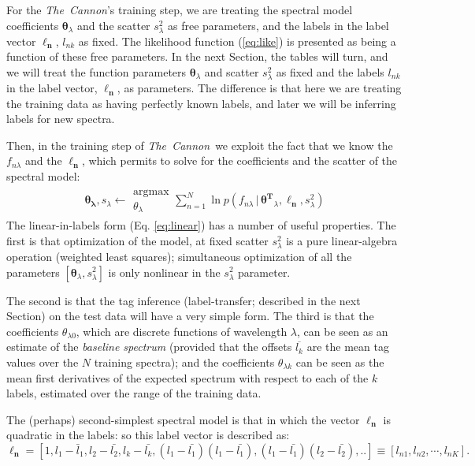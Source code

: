 \documentclass[12pt, preprint]{aastex}
\newcommand{\sectionname}{Section}
\newcommand{\set}[1]{\bm{#1}}
\newcommand{\mean}[1]{\overline{#1}}
\newcommand{\given}{\,|\,}
\newcommand{\tc}{\textsl{The~Cannon}}
\begin{document}
For the \tc 's training step, we are treating the spectral model coefficients
$\set{\theta}_\lambda$ and the scatter $s_\lambda^2$ as free parameters, and the
labels in the label vector $\set{\ell_n}$, $l_{nk}$ as fixed.
The likelihood function (\ref{eq:like}) is presented as being a
function of these free parameters.
In the next \sectionname, the tables will turn, and we will treat the
function parameters $\set{\theta}_\lambda$ and scatter $s_{\lambda}^2$ as fixed and
the labels $l_{nk}$ in the label vector, $\set{\ell_n}$, as parameters.
The difference is that here we are treating the training data as
having perfectly known labels, and later we will be inferring labels for
new spectra.

Then, in the training step of \tc\ we exploit the fact that we know the $f_{n\lambda}$
and the $\set{\ell_n}$, which permits to solve for the coefficients and the scatter of the spectral model:
\begin{eqnarray}
\set{\theta_\lambda},s_\lambda \leftarrow \substack{\mbox{argmax}\\
{\theta_\lambda}  }
\sum_{n=1}^N \ln p(f_{n\lambda}\given\set{\theta^T}_\lambda, \boldsymbol{\ell_n}, s_\lambda^2)
\label{eq:trainingstep}
\end{eqnarray}
The linear-in-labels form (Eq. \ref{eq:linear}) has a number of useful properties.
The first is that optimization of the model, at fixed scatter
$s_\lambda^2$ is a pure linear-algebra operation (weighted least
squares); simultaneous optimization of all the parameters
$[\set{\theta}_\lambda,s_\lambda^2]$ is only nonlinear in the $s_\lambda^2$
parameter.

%
The second is that the tag inference (label-transfer; described in the
next Section) on the test data will have a very simple form.
The third is that the coefficients $\theta_{\lambda 0}$, which are discrete
functions of wavelength $\lambda$, can be seen as an estimate of
the \emph{baseline spectrum} (provided that the offsets $\mean{l_k}$ are
the mean tag values over the $N$ training spectra); and the
coefficients $\theta_{\lambda k}$ can be seen as the mean first derivatives of
the expected spectrum with respect to each of the $k$ labels, estimated
over the range of the training data.

The (perhaps) second-simplest spectral model is that in which the
vector $\set{\ell_n}$ is quadratic in the labels: so this label vector is described as:
\begin{equation}
\set{\ell_n} =  [1, l_1 - \bar{l}_1, l_2 - \bar{l_2}, l_k - \bar{l_k}, (l_1 - \bar{l_1})(l_1 - \bar{l_1}), (l_1 - \bar{l_1})(l_2 - \bar{l_2}), .. ] \equiv [l_{n1}, l_{n2}, \cdots, l_{nK}].
\label{eq:quadinlabels}
\end{equation}
\end{document}

